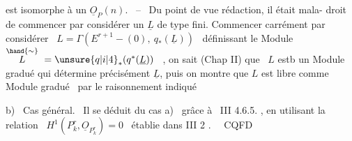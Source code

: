 
\margin{\ensuremath{/}}est isomorphe à un $\underline{O}_P(n)$. \ -- \ Du point de vue rédaction, il était mala-%
droit de commencer par considérer un $\underline{L}$ de type fini. Commencer carrément
par considérer \ $L = \Gamma(E^{r+1}-(0),\ q_*(\underline{L}))$ \ définissant le Module
$\overset{\hand{\sim}}{L} \ = \unsure{q|i|4}_*(q^*(\underline{L}))$ \ , on sait (Chap II) que \ $L$ estb un Module gradué qui
détermine précisément $\underline{L}$, puis on montre que $L$ est libre comme Module
gradué \ par le raisonnement indiqué\margin{\ensuremath{\swarrow}}

b) \ Cas général. \ Il se déduit du cas a) \ grâce à \ III 4.6.5. , en
utilisant la relation \ $H^1(P^r_k,\underline{O}_{P^r_k}) = 0$ \ établie dans III 2 . \ \ CQFD\margin{\ensuremath{/}}

